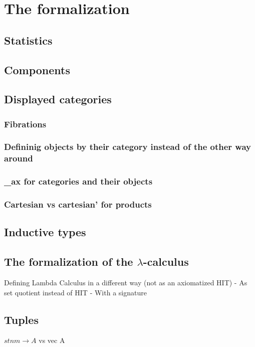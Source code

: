 \chapter{The formalization}

\section{Statistics}

\section{Components}

\section{Displayed categories}

\subsection{Fibrations}

\subsection{Defininig objects by their category instead of the other way around}

\subsection{\_ax for categories and their objects}

\subsection{Cartesian vs cartesian' for products}

\section{Inductive types}

\section{The formalization of the \texorpdfstring{$ \lambda $}{lambda}-calculus}
Defining Lambda Calculus in a different way (not as an axiomatized HIT)
  - As set quotient instead of HIT
  - With a signature

\section{Tuples}
$ stn m \to A $ vs vec A

